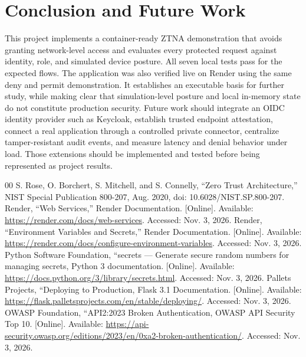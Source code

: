 \documentclass[conference]{IEEEtran}
\begin{document}
\section{Conclusion and Future Work}
This project implements a container-ready ZTNA demonstration that avoids granting network-level access and evaluates every protected request against identity, role, and simulated device posture. All seven local tests pass for the expected flows. The application was also verified live on Render using the same deny and permit demonstration. It establishes an executable basis for further study, while making clear that simulation-level posture and local in-memory state do not constitute production security. Future work should integrate an OIDC identity provider such as Keycloak, establish trusted endpoint attestation, connect a real application through a controlled private connector, centralize tamper-resistant audit events, and measure latency and denial behavior under load. Those extensions should be implemented and tested before being represented as project results.



\begin{thebibliography}{00}
 S. Rose, O. Borchert, S. Mitchell, and S. Connelly, ``Zero Trust Architecture,'' NIST Special Publication 800-207, Aug. 2020, doi: 10.6028/NIST.SP.800-207.
 Render, ``Web Services,'' Render Documentation. [Online]. Available: \url{https://render.com/docs/web-services}. Accessed: Nov. 3, 2026.
 Render, ``Environment Variables and Secrets,'' Render Documentation. [Online]. Available: \url{https://render.com/docs/configure-environment-variables}. Accessed: Nov. 3, 2026.
 Python Software Foundation, ``secrets --- Generate secure random numbers for managing secrets, Python 3 documentation. [Online]. Available: \url{https://docs.python.org/3/library/secrets.html}. Accessed: Nov. 3, 2026.
 Pallets Projects, ``Deploying to Production, Flask 3.1 Documentation. [Online]. Available: \url{https://flask.palletsprojects.com/en/stable/deploying/}. Accessed: Nov. 3, 2026.
 OWASP Foundation, ``API2:2023 Broken Authentication, OWASP API Security Top 10. [Online]. Available: \url{https://api-security.owasp.org/editions/2023/en/0xa2-broken-authentication/}. Accessed: Nov. 3, 2026.
\end{thebibliography}
\end{document}
